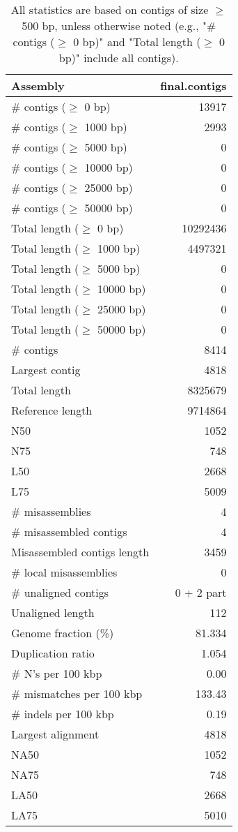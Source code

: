 \documentclass[12pt,a4paper]{article}
\begin{document}
\begin{table}[ht]
\begin{center}
\caption{All statistics are based on contigs of size $\geq$ 500 bp, unless otherwise noted (e.g., "\# contigs ($\geq$ 0 bp)" and "Total length ($\geq$ 0 bp)" include all contigs).}
\begin{tabular}{|l*{1}{|r}|}
\hline
Assembly & final.contigs \\ \hline
\# contigs ($\geq$ 0 bp) & 13917 \\ \hline
\# contigs ($\geq$ 1000 bp) & 2993 \\ \hline
\# contigs ($\geq$ 5000 bp) & 0 \\ \hline
\# contigs ($\geq$ 10000 bp) & 0 \\ \hline
\# contigs ($\geq$ 25000 bp) & 0 \\ \hline
\# contigs ($\geq$ 50000 bp) & 0 \\ \hline
Total length ($\geq$ 0 bp) & 10292436 \\ \hline
Total length ($\geq$ 1000 bp) & 4497321 \\ \hline
Total length ($\geq$ 5000 bp) & 0 \\ \hline
Total length ($\geq$ 10000 bp) & 0 \\ \hline
Total length ($\geq$ 25000 bp) & 0 \\ \hline
Total length ($\geq$ 50000 bp) & 0 \\ \hline
\# contigs & 8414 \\ \hline
Largest contig & 4818 \\ \hline
Total length & 8325679 \\ \hline
Reference length & 9714864 \\ \hline
N50 & 1052 \\ \hline
N75 & 748 \\ \hline
L50 & 2668 \\ \hline
L75 & 5009 \\ \hline
\# misassemblies & 4 \\ \hline
\# misassembled contigs & 4 \\ \hline
Misassembled contigs length & 3459 \\ \hline
\# local misassemblies & 0 \\ \hline
\# unaligned contigs & 0 + 2 part \\ \hline
Unaligned length & 112 \\ \hline
Genome fraction (\%) & 81.334 \\ \hline
Duplication ratio & 1.054 \\ \hline
\# N's per 100 kbp & 0.00 \\ \hline
\# mismatches per 100 kbp & 133.43 \\ \hline
\# indels per 100 kbp & 0.19 \\ \hline
Largest alignment & 4818 \\ \hline
NA50 & 1052 \\ \hline
NA75 & 748 \\ \hline
LA50 & 2668 \\ \hline
LA75 & 5010 \\ \hline
\end{tabular}
\end{center}
\end{table}
\end{document}
